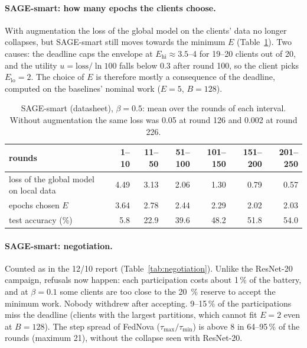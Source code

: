 \documentclass[11pt,a4paper]{article}
\begin{document}
\paragraph{SAGE-smart: how many epochs the clients choose.} With
augmentation the loss of the global model on the clients' data no longer
collapses, but SAGE-smart still moves towards the minimum $E$
(Table~\ref{tab:epochs}). Two causes: the deadline caps the envelope at
$E_\text{hi}\approx 3.5$--4 for 19--20 clients out of 20, and the utility
$u=\text{loss}/\ln 100$ falls below 0.3 after round 100, so the client picks
$E_\text{lo}=2$. The choice of $E$ is therefore mostly a consequence of the
deadline, computed on the baselines' nominal work ($E=5$, $B=128$).

\begin{table}[H]
\centering
\caption{SAGE-smart (datasheet), $\beta=0.5$: mean over the rounds of each
interval. Without augmentation the same loss was 0.05 at round 126 and 0.002
at round 226.}
\label{tab:epochs}
\begin{tabular}{lrrrrrr}
\toprule
rounds & 1--10 & 11--50 & 51--100 & 101--150 & 151--200 & 201--250 \\
\midrule
loss of the global model on local data & 4.49 & 3.13 & 2.06 & 1.30 & 0.79 & 0.57 \\
epochs chosen $E$                      & 3.64 & 2.78 & 2.44 & 2.29 & 2.02 & 2.03 \\
test accuracy (\%)                     &  5.8 & 22.9 & 39.6 & 48.2 & 51.8 & 54.0 \\
\bottomrule
\end{tabular}
\end{table}

\paragraph{SAGE-smart: negotiation.} Counted as in the 12/10 report
(Table~\ref{tab:negotiation}). Unlike the ResNet-20 campaign, refusals now
happen: each participation costs about 1\,\% of the battery, and at
$\beta=0.1$ some clients are too close to the \SI{20}{\percent} reserve to
accept the minimum work. Nobody withdrew after accepting. 9--15\,\% of the
participations miss the deadline (clients with the largest partitions, which
cannot fit $E=2$ even at $B=128$). The step spread of FedNova
($\tau_\text{max}/\tau_\text{min}$) is above 8 in 64--95\,\% of the rounds
(maximum 21), without the collapse seen with ResNet-20.
\end{document}
